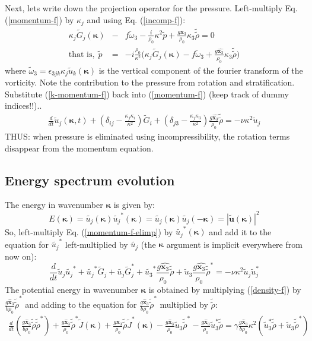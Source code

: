\documentclass[12pt]{article}
\newcommand{\bk}{\bm{\kappa}}
\newcommand{\kp}{\kappa}
\begin{document}
Next, lets write down the projection operator for the pressure.
Left-multiply Eq. (\ref{momentum-f}) by $\kp_j$ and using Eq. (\ref{incomp-f}):
\begin{eqnarray}
\kp_j\tilde G_j(\bk) &-& f \tilde \omega_3 - \frac{i}{\rho_0} \kp^2 \tilde p +  
\frac{g\hat{\bm{x}_3}}{\rho_0}\kp_3\tilde{\tilde \rho} = 0\nonumber\\
\mbox{that~is,}~~\tilde p &=& -i\frac{\rho_0}{\kp^2}
\Big(\kp_j\tilde G_j(\bk) - f \tilde \omega_3 
+  \frac{g\hat{\bm{x}_3}}{\rho_0}\kp_3\tilde{\tilde \rho}\Big) 
\label{k-momentum-f}
\end{eqnarray}
where $\tilde\omega_3=\epsilon_{3jk}\kp_j \tilde u_k(\bk)$ is the
vertical component of the fourier transform of the vorticity. Note the contribution to the pressure from rotation and stratification. Substitute (\ref{k-momentum-f}) back into (\ref{momentum-f}) (keep track of dummy indices!!)..
\begin{eqnarray}
\frac{d}{dt} \tilde u_j(\bm{\kappa},t)  + (\delta_{ij}-\frac{\kappa_j \kp_i}{\kp^2}) \tilde G_i + (\delta_{j3} - \frac{\kp_j \kp_3}{\kp^2})\frac{g\hat{\bm{x}_3}}{\rho_0}\tilde{\tilde \rho} =  -\nu\kappa^2 \tilde u_j
\label{momentum-f-elimp}
\end{eqnarray}
THUS: when pressure is eliminated using incompressibility, the rotation terms disappear from the momentum equation.
\subsection{Energy spectrum evolution}
The energy in wavenumber $\bk$ is given by:
\begin{equation}
E(\bk) = \tilde{{u}_j}(\bk) \tilde{{u}_j}^*(\bk) = \tilde{{u}_j}(\bk) \tilde{{u}_j}(-\bk)= |\tilde{\bm{u}}(\bk)|^2 
\end{equation}
So, left-multiply Eq. (\ref{momentum-f-elimp}) by
$\tilde{u_j}^*(\bk)$ and add it to the equation for $\tilde{u_j}^*$
left-multiplied by $\tilde{u_j}$ (the $\bk$ argument is implicit everywhere from now on):
\begin{equation}
\frac{d}{dt} \tilde u_j \tilde{{u}_j}^* + 
\tilde{u_j}^* \tilde G_j + \tilde{u_j} \tilde G_j^*+ \tilde{u_3}^*\frac{g\hat{\bm{x}_3}}{\rho_0}\tilde{\tilde \rho}  + \tilde u_3 \frac{g\hat{\bm{x}_3}}{\rho_0}
\tilde{\tilde \rho}^*  = -\nu \kp^2 \tilde u_j \tilde u_j^*
\label{ke}
\end{equation}
The potential energy in wavenumber $\bk$ is obtained by multiplying
(\ref{density-f}) by $\frac{g \hat{\bm x}_3}{b \rho_0} \tilde{\tilde\rho}^*$ and adding to the equation for 
$\frac{g \hat{\bm x}_3}{b \rho_0}\tilde{\tilde\rho}^*$ multiplied by $\tilde{\tilde\rho}$:
\begin{eqnarray}
\frac{d}{dt}( \frac{g \hat{\bm x}_3}{b \rho_0} \tilde{\tilde \rho} \tilde{\tilde \rho}^*)  + 
\frac{g \hat{\bm x}_3}{\rho_0} \tilde{\tilde \rho}^* \tilde J(\bm{\kappa}) + \frac{g \hat{\bm x}_3}{\rho_0} \tilde{\tilde \rho} \tilde J^*(\bm{\kappa}) 
- \frac{g \hat{\bm x}_3}{\rho_0} \tilde u_3 \tilde{\tilde \rho}^* - \frac{g \hat{\bm x}_3}{\rho_0} \tilde u_3^* \tilde{\tilde \rho} = \gamma \frac{g \hat{\bm x}_3}{b\rho_0} \kappa^2 (\tilde u_3^* \tilde {\tilde \rho} + \tilde u_3 \tilde {\tilde \rho}^*)
\label{pe}
\end{eqnarray}
 
\end{document}

